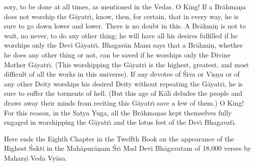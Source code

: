 sory, to be done at all times, as mentioned in the Vedas. O King! If a Br\=ahma\d{n}a does not worship the G\=ayatr\={\i}, know, then, for certain, that in every way, he is sure to go down lower and lower. There is no doubt in this. A Br\=ahmi\d{n} is not to wait, no never, to do any other thing; he will have all his desires fulfilled if he worships only the Dev\={\i} G\=ayatr\={\i}. Bhagav\=an Manu says that a Br\=ahmi\d{n}, whether he does any other thing or not, can be saved if he worships only the Divine Mother G\=ayatr\={\i}. (This worshipping the G\=ayatr\={\i} is the highest, greatest, and most difficult of all the works in this universe). If any devotee of \'Siva or Vi\d{s}\d{n}u or of any other Deity worships his desired Deity without repeating the G\=ayatr\={\i}, he is sure to suffer the torments of hell. (But this age of K\=al\={\i} deludes the people and draws away their minds from reciting this G\=ayatr\={\i} save a few of them.) O King! For this reason, in the Satya Yuga, all the Br\=ahma\d{n}as kept themselves fully engaged in worshipping the G\=ayatr\={\i} and the lotus feet of the Dev\={\i} Bhagavat\={\i}.

Here ends the Eighth Chapter in the Twelfth Book on the appearance of the Highest \'Sakti in the Mah\=apur\=a\d{n}am \'Sr\={\i} Mad Dev\={\i} Bh\=agavatam of 18,000 verses by Mahar\d{s}i Veda Vy\=asa.



